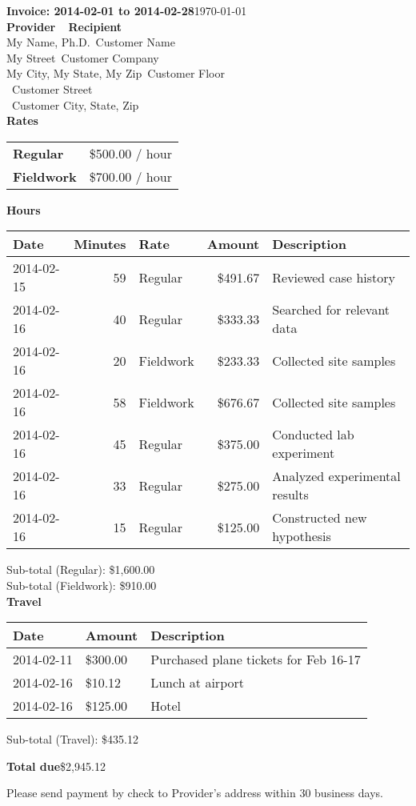 \documentclass{article}
\begin{document}
{\Large \textbf{Invoice: 2014-02-01 to 2014-02-28}}\hfill \today\\

\textbf{Provider} \mbox{}~\hfill{} \textbf{Recipient} \\
My Name, Ph.D.\mbox{}~\hfill Customer Name \\
My Street\mbox{}~\hfill Customer Company \\
My City, My State, My Zip\mbox{}~\hfill Customer Floor \\
\mbox{}~\hfill Customer Street \\
\mbox{}~\hfill Customer City, State, Zip \\

{\Large\textbf{Rates}}


\begin{tabular}{ll}
\textbf{Regular} & \$500.00 / hour \\
\textbf{Fieldwork} & \$700.00 / hour \\
\end{tabular}

{\Large\textbf{Hours}}


\begin{tabular}{|l|r|l|r|l|}
\hline
\textbf{Date}&\textbf{Minutes}&\textbf{Rate}&\textbf{Amount}&\textbf{Description} \\ \hline
\hline
2014-02-15 & 59 & Regular & \$491.67 & Reviewed case history\\
\hline
2014-02-16 & 40 & Regular & \$333.33 & Searched for relevant data\\
\hline
2014-02-16 & 20 & Fieldwork & \$233.33 & Collected site samples\\
\hline
2014-02-16 & 58 & Fieldwork & \$676.67 & Collected site samples\\
\hline
2014-02-16 & 45 & Regular & \$375.00 & Conducted lab experiment\\
\hline
2014-02-16 & 33 & Regular & \$275.00 & Analyzed experimental results\\
\hline
2014-02-16 & 15 & Regular & \$125.00 & Constructed new hypothesis\\
\hline
\end{tabular}


Sub-total (Regular): \$1,600.00 \\Sub-total (Fieldwork): \$910.00 \\


{\Large\textbf{Travel}}


\begin{tabular}{|l|l|l|}
\hline
\textbf{Date}&\textbf{Amount}&\textbf{Description}\\ \hline
\hline 2014-02-11 & \$300.00 & Purchased plane tickets for Feb 16-17 \\
\hline 2014-02-16 & \$10.12 & Lunch at airport \\
\hline 2014-02-16 & \$125.00 & Hotel \\
\hline
\end{tabular}


Sub-total (Travel): \$435.12

\vfill
{\Large\textbf{Total due}\hfill\$2,945.12}

Please send payment by check to Provider's address within 30 business days.\hfill {}
\end{document}
